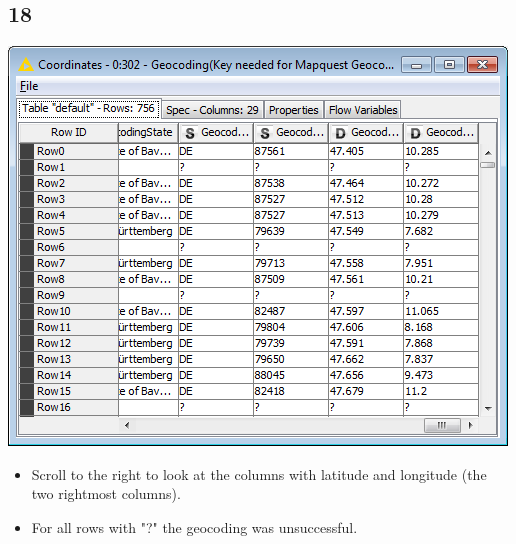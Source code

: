 \documentclass{beamer}
\begin{document}
\subsection{18}
\begin{frame}
	\begin{center}
  		\includegraphics[height=0.6\textheight]{18.png}
	\end{center}
	\begin{itemize}
		\item Scroll to the right to look at the columns with latitude and longitude (the two rightmost columns).
		\item For all rows with "?" the geocoding was unsuccessful.
	\end{itemize}
\end{frame}
\end{document}
